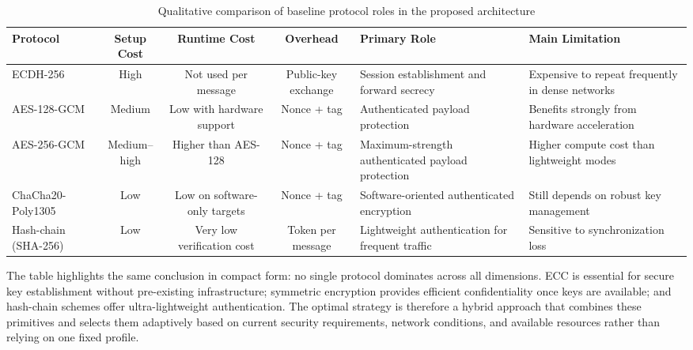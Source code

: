 \begin{landscape}
\begin{table}[H]
\centering
\small
\setlength{\tabcolsep}{5pt}
\caption{Qualitative comparison of baseline protocol roles in the proposed architecture}
\label{tab:protocol_comparison}
\renewcommand{\arraystretch}{1.2}
\begin{tabularx}{\linewidth}{|l|c|c|c|>{\raggedright\arraybackslash}X|>{\raggedright\arraybackslash}X|}
\hline
\textbf{Protocol} &
\textbf{Setup Cost} &
\textbf{Runtime Cost} &
\textbf{Overhead} &
\textbf{Primary Role} &
\textbf{Main Limitation} \\
\hline
ECDH-256 &
High &
Not used per message &
Public-key exchange &
Session establishment and forward secrecy &
Expensive to repeat frequently in dense networks \\
\hline
AES-128-GCM &
Medium &
Low with hardware support &
Nonce + tag &
Authenticated payload protection &
Benefits strongly from hardware acceleration \\
\hline
AES-256-GCM &
Medium--high &
Higher than AES-128 &
Nonce + tag &
Maximum-strength authenticated payload protection &
Higher compute cost than lightweight modes \\
\hline
ChaCha20-Poly1305 &
Low &
Low on software-only targets &
Nonce + tag &
Software-oriented authenticated encryption &
Still depends on robust key management \\
\hline
Hash-chain (SHA-256) &
Low &
Very low verification cost &
Token per message &
Lightweight authentication for frequent traffic &
Sensitive to synchronization loss \\
\hline
\end{tabularx}
\end{table}
\end{landscape}



The table highlights the same conclusion in compact form: no single protocol dominates across all dimensions. ECC is essential for secure key establishment without pre-existing infrastructure; symmetric encryption provides efficient confidentiality once keys are available; and hash-chain schemes offer ultra-lightweight authentication. The optimal strategy is therefore a hybrid approach that combines these primitives and selects them adaptively based on current security requirements, network conditions, and available resources rather than relying on one fixed profile.
